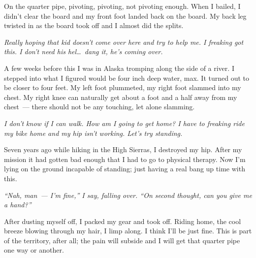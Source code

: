 On the quarter pipe, pivoting, pivoting, not pivoting enough. When I bailed, I didn't clear the board and my front foot landed back on the board. My back leg twisted in as the board took off and I almost did the splits.

\emph{Really hoping that kid doesn't come over here and try to help me. I freaking got this. I don't need his hel\dots\ dang it, he's coming over.}

A few weeks before this I was in Alaska tromping along the side of a river. I stepped into what I figured would be four inch deep water, max. It turned out to be closer to four feet. My left foot plummeted, my right foot slammed into my chest. My right knee can naturally get about a foot and a half away from my chest~--- there should not be any touching, let alone slamming.

\emph{I don't know if I can walk. How am I going to get home? I have to freaking ride my bike home and my hip isn't working. Let's try standing.}

Seven years ago while hiking in the High Sierras, I destroyed my hip. After my mission it had gotten bad enough that I had to go to physical therapy. Now I'm lying on the ground incapable of standing; just having a real bang up time with this.

\emph{``Nah, man~--- I'm fine,'' I say, falling over. ``On second thought, can you give me a hand?''}

After dusting myself off, I packed my gear and took off. Riding home, the cool breeze blowing through my hair, I limp along. I think I'll be just fine. This is part of the territory, after all; the pain will subside and I will get that quarter pipe one way or another.
